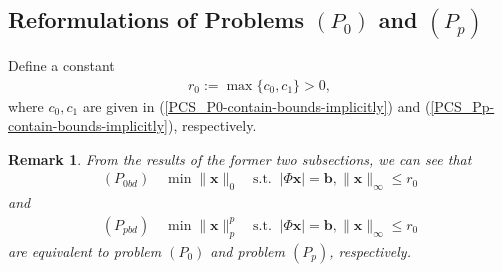 \documentclass[12pt]{article}
\newtheorem{Remark}{Remark}[part]
\begin{document}
\subsection{Reformulations of Problems $(P_0)$ and $(P_p)$}

\hspace{4mm} Define a constant
\begin{eqnarray}\label{on-constant-c0}
r_0:=\max\{c_{0},c_{1}\}>0,
\end{eqnarray}
where $c_{0}, c_{1}$  are given in (\ref{PCS_P0-contain-bounds-implicitly}) and (\ref{PCS_Pp-contain-bounds-implicitly}), respectively.
\begin{Remark}\label{on-constant-c0-2}
From the results of the former two subsections, we can see that
\begin{eqnarray*}%
(P_{0bd})\quad\min \|\mathbf{x}\|_{0}\quad \textrm{s.t.}\;\;|\Phi\mathbf{x}|=\mathbf{b}, \|\mathbf{x}\|_{\infty}\leqslant r_0
\end{eqnarray*}
and
\begin{eqnarray*}
(P_{pbd})\quad\min \|\mathbf{x}\|_{p}^{p}\quad \textrm{s.t.}\;\;|\Phi\mathbf{x}|=\mathbf{b}, \|\mathbf{x}\|_{\infty}\leqslant r_0
\end{eqnarray*}
are equivalent to problem $(P_0)$ and problem $(P_p)$, respectively.
\end{Remark}
\end{document}
